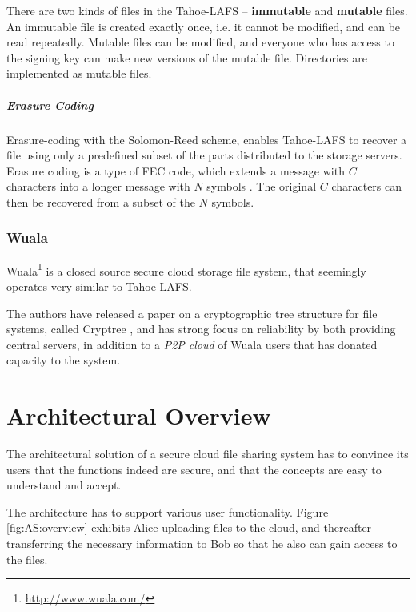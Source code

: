 \documentclass[pdftex,english,10pt,b5paper,twoside]{book}
\begin{document}
There are two kinds of files in the Tahoe-\ac{LAFS} -- \textbf{immutable} and
\textbf{mutable} files. An immutable file is created exactly once, i.e. it
cannot be modified, and can be read repeatedly. Mutable files can be modified,
and everyone who has access to the signing key can make new versions of
the mutable file. Directories are implemented as mutable files.

\paragraph{Erasure Coding}

Erasure-coding with the Solomon-Reed scheme, enables Tahoe-\ac{LAFS} to recover
a file using only a predefined subset of the parts distributed to the storage
servers. Erasure coding is a type of \ac{FEC} code, which extends a message
with $C$ characters into a longer message with $N$ symbols
\cite{t_reed-solomon}. The original $C$ characters can then be recovered from a
subset of the $N$ symbols.

\subsection{Wuala}

Wuala\footnote{\url{http://www.wuala.com/}} is a closed source secure cloud
storage file system, that seemingly operates very similar to Tahoe-\ac{LAFS}.

The authors have released a paper on a cryptographic tree structure for file
systems, called Cryptree \cite{cryptree}, and has strong focus on reliability
by both providing central servers, in addition to a \emph{P2P cloud} of Wuala
users that has donated capacity to the system. 

\chapter{Architectural Overview}
\label{chap:AS}

The architectural solution of a secure cloud file sharing system has to convince
its users that the functions indeed are secure, and that the concepts are easy
to understand and accept. 

The architecture has to support various user functionality. Figure
\ref{fig:AS:overview} exhibits Alice uploading files to the cloud, and
thereafter transferring the necessary information to Bob so that he also can
gain access to the files.
\end{document}

